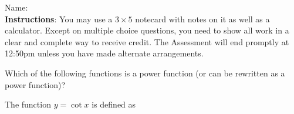 \documentclass[addpoints]{exam}
\begin{document}
		
\vspace*{0pt}

\noindent
Name: \underline{\hspace{2in}} \\


\noindent
\textbf{Instructions}:  You may use a $3 \times 5$ notecard with notes on it as well as a calculator. Except on multiple choice questions, you need to show all work in a clear and complete way to receive credit. The Assessment will end promptly at 12:50pm unless you have made alternate arrangements. 

\begin{questions}


\question[2] Which of the following functions is a power function (or can be rewritten as a power function)? 

\question[2] The function $y = \cot x$ is defined as 
\end{questions}
\end{document}
